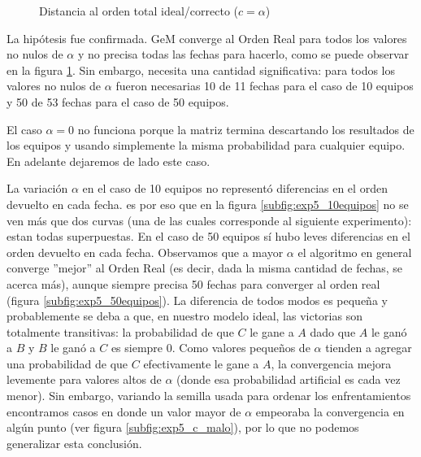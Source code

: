 \begin{figure}[H]
    \caption{Distancia al orden total ideal/correcto ($c = \alpha$)}
    \label{fig:exp5_1}
    \centering
\end{figure}

\par La hip\'otesis fue confirmada. GeM converge al Orden Real para todos los
valores no nulos de $\alpha$ y no precisa todas las fechas para hacerlo, como se
puede observar en la figura \ref{fig:exp5_1}. Sin embargo, necesita una cantidad
significativa: para todos los valores no nulos de $\alpha$ fueron necesarias 10
de 11 fechas para el caso de 10 equipos y 50 de 53 fechas para el caso de 50
equipos.

\par El caso $\alpha=0$ no funciona porque la matriz termina descartando los
resultados de los equipos y usando simplemente la misma probabilidad para
cualquier equipo. En adelante dejaremos de lado este caso.

\par La variaci\'on $\alpha$ en el caso de 10 equipos no represent\'o
diferencias en el orden devuelto en cada fecha. es por eso que en la figura
\ref{subfig:exp5_10equipos} no se ven m\'as que dos curvas (una de las cuales
corresponde al siguiente experimento): estan todas superpuestas. En el caso de
50 equipos s\'i hubo leves diferencias en el orden devuelto en cada fecha.
Observamos que a mayor $\alpha$ el algoritmo en general converge ''mejor'' al
Orden Real (es decir, dada la misma cantidad de fechas, se acerca m\'as), aunque
siempre precisa 50 fechas para converger al orden real (figura
\ref{subfig:exp5_50equipos}). La diferencia de todos modos es peque\~na y probablemente se deba a que, en
nuestro modelo ideal, las victorias son totalmente transitivas: la probabilidad
de que $C$ le gane a $A$ dado que $A$ le gan\'o a $B$ y $B$ le ganó a $C$ es
siempre $0$.  Como valores peque\~nos de $\alpha$ tienden a agregar una
probabilidad de que $C$ efectivamente le gane a $A$, la convergencia mejora
levemente para valores altos de $\alpha$ (donde esa probabilidad artificial es
cada vez menor). Sin embargo, variando la semilla usada para ordenar los
enfrentamientos encontramos casos en donde un valor mayor de $\alpha$ empeoraba
la convergencia en alg\'un punto (ver figura \ref{subfig:exp5_c_malo}), por lo
que no podemos generalizar esta conclusi\'on.

